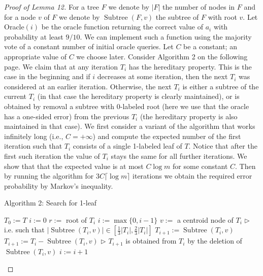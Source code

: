 \begin{proof}[Proof of Lemma 12]
For a tree $F$ we denote by $|F|$ the number of nodes in $F$ and for a node $v$ of $F$ we denote by $\operatorname{Subtree}(F,v)$ the subtree of $F$ with root $v$. Let Oracle$(i)$ be the oracle function returning the correct value of $a_i$ with probability at least $9/10$. We can implement such a function using the majority vote of a constant number of initial oracle queries. Let $C$ be a constant; an appropriate value of $C$ we choose later. Consider Algorithm 2 on the following page.
We claim that at any iteration $T_i$ has the hereditary property. This is the case in the beginning and if $i$ decreases at some iteration, then the next $T_i$ was considered at an earlier iteration. Otherwise, the next $T_i$ is either a subtree of the current $T_i$ (in that case the hereditary property is clearly maintained), or is obtained by removal a subtree with 0-labeled root (here we use that the oracle has a one-sided error) from the previous $T_i$ (the hereditary property is also maintained in that case).
We first consider a variant of the algorithm that works infinitely long (i.e., $C=+\infty$) and compute the expected number of the first iteration such that $T_i$ consists of a single 1-labeled leaf of $T$. Notice that after the first such iteration the value of $T_i$ stays the same for all further iterations. We show that that the expected value is at most $C\log m$ for some constant $C$. Then by running the algorithm for $3C\lceil\log m\rceil$ iterations we obtain the required error probability by Markov's inequality.
\begin{authorclaim}{Algorithm 2: Search for 1-leaf}
\begin{algorithmic}
\State $T_0:=T$ 
\State $i:=0$
 \State $r:=$ root of $T_i$
  \State $i:=\max\{0,i-1\}$ 
  \State $v:=$ a centroid node of $T_i$
  \Statex \hspace{\algorithmicindent} $\triangleright$ i.e. such that $|\operatorname{Subtree}(T_i,v)|\in[\frac13|T_i|,\frac23|T_i|]$
   \State $T_{i+1}:=\operatorname{Subtree}(T_i,v)$
  \Else
   \State $T_{i+1}:=T_i-\operatorname{Subtree}(T_i,v)$
   \Statex \hspace{\algorithmicindent} $\triangleright$ $T_{i+1}$ is obtained from $T_i$ by the deletion of $\operatorname{Subtree}(T_i,v)$
  \EndIf
  \State $i:=i+1$
 \EndIf
\EndFor

\end{algorithmic}
\end{authorclaim}
\end{proof}
